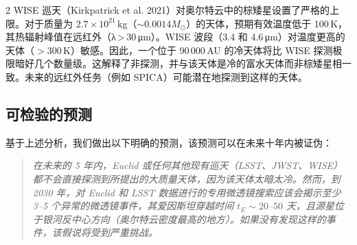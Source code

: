 \documentclass[11pt,a4paper]{article}
\begin{document}
\begin{multicols}{2}
		WISE 巡天（Kirkpatrick et al. 2021）对奥尔特云中的棕矮星设置了严格的上限。对于质量为 \(2.7\times10^{21}\) kg（\(\sim 0.0014 M_{\odot}\)）的天体，预期有效温度低于 100 K，其热辐射峰值在远红外（λ > 30 μm）。WISE 波段（3.4 和 4.6 μm）对温度更高的天体（\(>300\) K）敏感。因此，一个位于 90\,000 AU 的冷天体将比 WISE 探测极限暗好几个数量级。这解释了非探测，并与该天体是冷的富水天体而非棕矮星相一致。未来的远红外任务（例如 SPICA）可能潜在地探测到这样的天体。
		
		\subsection{可检验的预测}
		
		基于上述分析，我们做出以下明确的预测，该预测可以在未来十年内被证伪：
		
		\begin{quote}
			\itshape
			在未来的 5 年内，Euclid 或任何其他现有巡天（LSST、JWST、WISE）都不会直接探测到所提出的大质量天体，因为该天体太暗太冷。然而，到 2030 年，对 Euclid 和 LSST 数据进行的专用微透镜搜索应该会揭示至少 3–5 个异常的微透镜事件，其爱因斯坦穿越时间 \(t_E \sim 20\)–\(50\) 天，且源星位于银河反中心方向（奥尔特云密度最高的地方）。如果没有发现这样的事件，该假说将受到严重挑战。
		\end{quote}
		
		\end{multicols}
		
\end{document}
